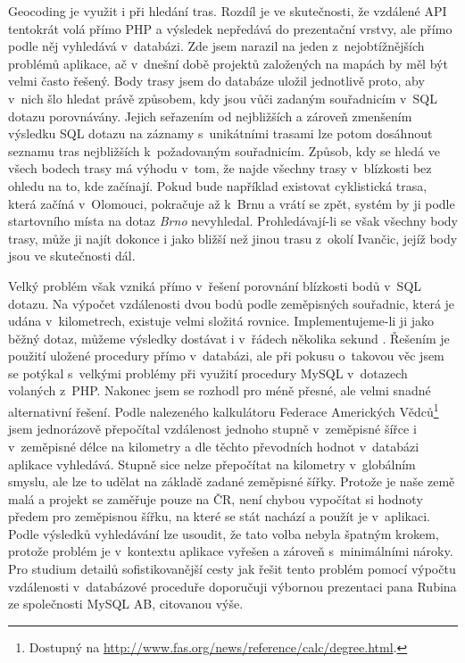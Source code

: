 Geocoding je využit i při hledání tras. Rozdíl je ve skutečnosti, že
vzdálené API tentokrát volá přímo PHP a výsledek nepředává do
prezentační vrstvy, ale přímo podle něj vyhledává v~databázi. Zde
jsem narazil na jeden z~nej\-obtížnějších problémů aplikace, ač
v~dnešní době projektů založených na mapách by měl být velmi často
řešený. Body trasy jsem do databáze uložil jednotlivě proto, aby
v~nich šlo hledat právě způsobem, kdy jsou vůči zadaným souřadnicím v~SQL dotazu
porovnávány. Jejich seřazením od nej\-bližších a zároveň zmenšením
výsledku SQL dotazu na záznamy s~unikátními trasami lze potom
dosáhnout seznamu tras nej\-bližších k~požadovaným souřadnicím. Způsob,
kdy se hledá ve všech bodech trasy má výhodu v~tom, že najde všechny
trasy v~blízkosti bez ohledu na to, kde začínají. Pokud bude
například existovat cyklistická trasa, která začíná v~Olomouci,
pokračuje až k~Brnu a vrátí se zpět, systém by ji podle startovního
místa na dotaz {\it Brno} nevyhledal. Prohledávají-li se však všechny
body trasy, může ji najít dokonce i jako bližší než jinou trasu
z~okolí Ivančic, jejíž body jsou ve skutečnosti dál.

Velký problém však vzniká přímo v~řešení porovnání blízkosti bodů
v~SQL dotazu. Na výpočet vzdálenosti dvou bodů podle zeměpisných
souřadnic, která je udána v~kilometrech, existuje velmi složitá
rovnice. Implementujeme-li ji jako běžný dotaz,
můžeme výsledky dostávat i v~řádech několika sekund
\cite{distanceSearch}. Řešením je použití uložené procedury přímo
v~databázi, ale při pokusu o~takovou věc jsem se potýkal s~velkými
problémy při využití procedury MySQL v~dotazech volaných z~PHP.
Nakonec jsem se rozhodl pro méně přesné, ale velmi snadné
alternativní řešení. Podle nalezeného kalkulátoru Federace Amerických
Vědců\footnote{Dostupný na
\url{http://www.fas.org/news/reference/calc/degree.html}.} jsem
jednorázově přepočítal vzdálenost jednoho stupně v~zeměpisné šířce i
v~zeměpisné délce na kilometry a dle těchto převodních hodnot
v~databázi aplikace vyhledává. Stupně sice nelze přepočítat na
kilometry v~globálním smyslu, ale lze to udělat na základě zadané
zeměpisné šířky. Protože je naše země malá a projekt se zaměřuje
pouze na ČR, není chybou vypočítat si hodnoty předem pro zeměpisnou
šířku, na které se stát nachází a použít je v~aplikaci. Podle
výsledků vyhledávání lze usoudit, že tato volba nebyla špatným
krokem, protože problém je v~kontextu aplikace vyřešen a zároveň
s~minimálními nároky.
Pro studium detailů sofistikovanější cesty jak řešit tento problém
pomocí výpočtu vzdálenosti v~databázové proceduře doporučuji výbornou
prezentaci pana Rubina ze společnosti MySQL AB, citovanou výše.

